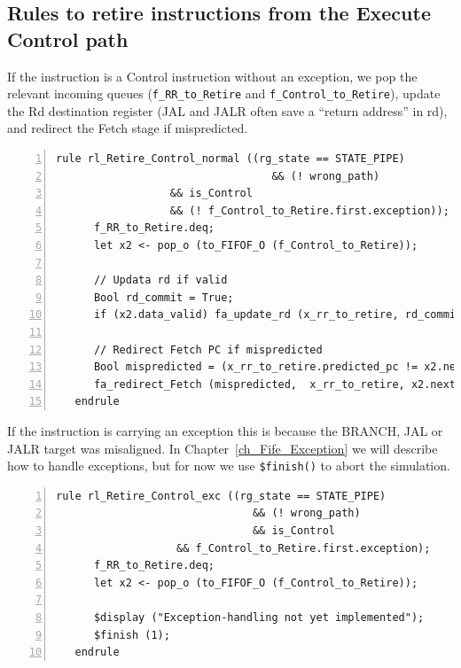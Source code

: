 
\subsection{Rules to retire instructions from the Execute Control path}

If the instruction is a Control instruction without an exception, we
pop the relevant incoming queues (\verb|f_RR_to_Retire| and
\verb|f_Control_to_Retire|), update the Rd destination register (JAL
and JALR often save a ``return address'' in rd), and redirect the
Fetch stage if mispredicted.

{\small
\begin{Verbatim}[frame=single, numbers=left, label=(In file:src\_Fife/S5\_Retire.bsv)]
   rule rl_Retire_Control_normal ((rg_state == STATE_PIPE)
                                  && (! wrong_path)
				  && is_Control
				  && (! f_Control_to_Retire.first.exception));
      f_RR_to_Retire.deq;
      let x2 <- pop_o (to_FIFOF_O (f_Control_to_Retire));

      // Updata rd if valid
      Bool rd_commit = True;
      if (x2.data_valid) fa_update_rd (x_rr_to_retire, rd_commit, x2.data);

      // Redirect Fetch PC if mispredicted
      Bool mispredicted = (x_rr_to_retire.predicted_pc != x2.next_pc);
      fa_redirect_Fetch (mispredicted,  x_rr_to_retire, x2.next_pc);
   endrule
\end{Verbatim}
}

If the instruction is carrying an exception this is because the
BRANCH, JAL or JALR target was misaligned.  In
Chapter~\ref{ch_Fife_Exception} we will describe how to handle
exceptions, but for now we use \verb|$finish()| to abort the
simulation.

{\small
\begin{Verbatim}[frame=single, numbers=left, label=(In file:src\_Fife/S5\_Retire.bsv)]
   rule rl_Retire_Control_exc ((rg_state == STATE_PIPE)
                               && (! wrong_path)
                               && is_Control
			       && f_Control_to_Retire.first.exception);
      f_RR_to_Retire.deq;
      let x2 <- pop_o (to_FIFOF_O (f_Control_to_Retire));

      $display ("Exception-handling not yet implemented");
      $finish (1);
   endrule
\end{Verbatim}
}


